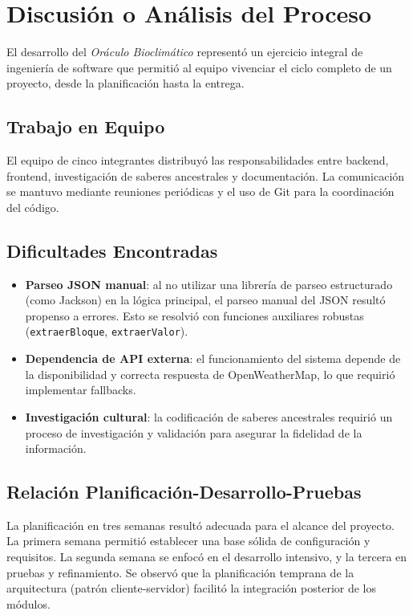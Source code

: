 \documentclass[conference]{IEEEtran}
\begin{document}
\section{Discusión o Análisis del Proceso}

El desarrollo del \textit{Oráculo Bioclimático} representó un ejercicio integral de ingeniería de software que permitió al equipo vivenciar el ciclo completo de un proyecto, desde la planificación hasta la entrega.

\subsection{Trabajo en Equipo}

El equipo de cinco integrantes distribuyó las responsabilidades entre backend, frontend, investigación de saberes ancestrales y documentación. La comunicación se mantuvo mediante reuniones periódicas y el uso de Git para la coordinación del código.

\subsection{Dificultades Encontradas}

\begin{itemize}
    \item \textbf{Parseo JSON manual}: al no utilizar una librería de parseo estructurado (como Jackson) en la lógica principal, el parseo manual del JSON resultó propenso a errores. Esto se resolvió con funciones auxiliares robustas (\texttt{extraerBloque}, \texttt{extraerValor}).
    \item \textbf{Dependencia de API externa}: el funcionamiento del sistema depende de la disponibilidad y correcta respuesta de OpenWeatherMap, lo que requirió implementar fallbacks.
    \item \textbf{Investigación cultural}: la codificación de saberes ancestrales requirió un proceso de investigación y validación para asegurar la fidelidad de la información.
\end{itemize}

\subsection{Relación Planificación-Desarrollo-Pruebas}

La planificación en tres semanas resultó adecuada para el alcance del proyecto. La primera semana permitió establecer una base sólida de configuración y requisitos. La segunda semana se enfocó en el desarrollo intensivo, y la tercera en pruebas y refinamiento. Se observó que la planificación temprana de la arquitectura (patrón cliente-servidor) facilitó la integración posterior de los módulos.
\end{document}
